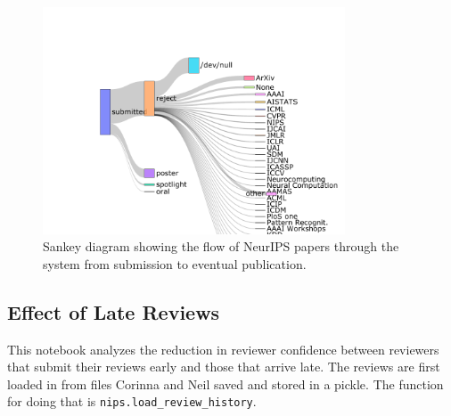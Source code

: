 \begin{figure}[htb]
\includegraphics[width=0.80\textwidth]{diagrams/neurips/where-do-neurips-papers-go.pdf}


\caption{Sankey diagram showing the flow of NeurIPS papers through the system from submission to eventual publication.}
\label{where-do-neurips-papers-go}
\end{figure}

\hypertarget{effect-of-late-reviews}{%
\subsection{Effect of Late Reviews}\label{effect-of-late-reviews}}

\begin{flushright}
\end{flushright}

This notebook analyzes the reduction in reviewer confidence between
reviewers that submit their reviews early and those that arrive late.
The reviews are first loaded in from files Corinna and Neil saved and
stored in a pickle. The function for doing that is
\texttt{nips.load\_review\_history}.

\begin{Shaded}
\begin{Highlighting}[]

\end{Highlighting}
\end{Shaded}

